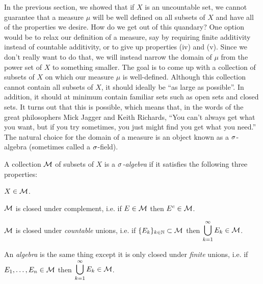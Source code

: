 \documentclass[main.tex]{subfiles}
\begin{document}
In the previous section, we showed that if $X$ is an uncountable set, we cannot guarantee that a measure $\mu$ will be well defined on all subsets of $X$ and have all of the properties we desire. How do we get out of this quandary? One option would be to relax our definition of a measure, say by requiring finite additivity instead of countable additivity, or to give up properties (iv) and (v). Since we don't really want to do that, we will instead narrow the domain of $\mu$ from the power set of $X$ to something smaller. The goal is to come up with a collection of subsets of $X$ on which our measure $\mu$ is well-defined. Although this collection cannot contain all subsets of $X$, it should ideally be ``as large as possible''. In addition, it should at minimum contain familiar sets such as open sets and closed sets. It turns out that this is possible, which means that, in the words of the great philosophers Mick Jagger and Keith Richards, ``You can't always get what you want, but if you try sometimes, you just might find you get what you need.'' The natural choice for the domain of a measure is an object known as a ${\sigma}$-algebra (sometimes called a ${\sigma}$-field).

\begin{definition}\label{def:salg}
A collection ${\mathcal M}$ of subsets of $X$ is a \emph{${\sigma}$-algebra} if it satisfies the following three properties:
\begin{romannum}
	\item $X \in {\mathcal M}$.
	\item ${\mathcal M}$ is closed under complement, i.e. if $E \in {\mathcal M}$ then $E^c \in {\mathcal M}$.
	\item ${\mathcal M}$ is closed under \emph{countable} unions, i.e. if $\{E_k\}_{k \in {\mathbb N}} \subset {\mathcal M}$ then $\begin{aligned}\bigcup_{k=1}^\infty E_k \in {\mathcal M} \end{aligned}$.
	
\end{romannum}
An \emph{algebra} is the same thing except it is only closed under \emph{finite} unions, i.e. if $E_1, \dots, E_n \in {\mathcal M}$ then $\begin{aligned}\bigcup_{k=1}^\infty E_k \in {\mathcal M} \end{aligned}$.
\end{definition}
\end{document}
